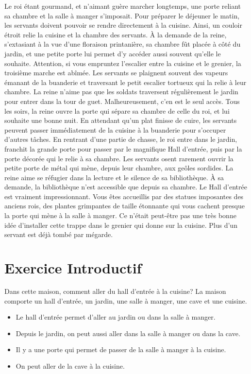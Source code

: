 \documentclass{article}
\begin{document}
Le roi étant gourmand, et n'aimant guère marcher longtemps, une porte reliant sa chambre et la salle à manger s'imposait.
Pour préparer le déjeuner le matin, les servants doivent pouvoir se rendre directement à la cuisine. Ainsi, un couloir étroit relie la cuisine et la chambre des servants.
À la demande de la reine, s'extasiant à la vue d'une floraison printanière, sa chambre fût placée à côté du jardin, et une petite porte lui permet d'y accéder aussi souvent qu'elle le souhaite.
Attention, si vous empruntez l'escalier entre la cuisine et le grenier, la troisième marche est abîmée.
Les servants se plaignent souvent des vapeurs émanant de la buanderie et traversant le petit escalier tortueux qui la relie à leur chambre.
La reine n'aime pas que les soldats traversent régulièrement le jardin pour entrer dans la tour de guet. Malheureusement, c'en est le seul accès.
Tous les soirs, la reine ouvre la porte qui sépare sa chambre de celle du roi, et lui souhaite une bonne nuit.
En attendant qu'un plat finisse de cuire, les servants peuvent passer immédiatement de la cuisine à la buanderie pour s'occuper d'autres tâches.
En rentrant d'une partie de chasse, le roi entre dans le jardin, franchit la grande porte pour passer par le magnifique Hall d'entrée, puis par la porte décorée qui le relie à sa chambre.
Les servants osent rarement ouvrir la petite porte de métal qui mène, depuis leur chambre, aux geôles sordides.
La reine aime se réfugier dans la lecture et le silence de sa bibliothèque. À sa demande, la bibliothèque n'est accessible que depuis sa chambre.
Le Hall d'entrée est vraiment impressionnant. Vous êtes accueillis par des statues imposantes des anciens rois, des plantes grimpantes de taille étonnante qui vous cachent presque la porte qui mène à la salle à manger.
Ce n'était peut-être pas une très bonne idée d'installer cette trappe dans le grenier qui donne sur la cuisine. Plus d'un servant est déjà tombé par mégarde.

\newpage
\section{Exercice Introductif}
Dans cette maison, comment aller du hall d'entrée à la cuisine?
La maison comporte un hall d'entrée, un jardin, une salle à manger, une cave et une cuisine.

\begin{itemize}
\item Le hall d'entrée permet d'aller au jardin ou dans la salle à manger.
\item Depuis le jardin, on peut aussi aller dans la salle à manger ou dans la cave.
\item Il y a une porte qui permet de passer de la salle à manger à la cuisine.
\item On peut aller de la cave à la cuisine.
\end{itemize}
\end{document}
